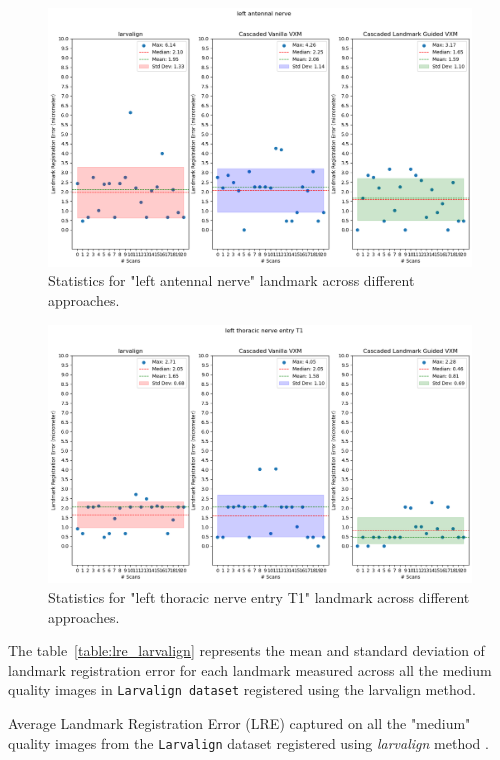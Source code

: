 \documentclass{report}
\begin{document}
\begin{figure}[h!]
	\centering
	\includegraphics[width=0.7\columnwidth]{resources/chapter5_fresh/output/left antennal nerve.png}
	\caption{Statistics for "left antennal nerve" landmark across different approaches.}
	\label{fig:landmark29}
\end{figure}

\begin{figure}[h!]
	\centering
	\includegraphics[width=0.7\columnwidth]{resources/chapter5_fresh/output/left thoracic nerve entry T1.png}
	\caption{Statistics for "left thoracic nerve entry T1" landmark across different approaches.}
	\label{fig:landmark30}
\end{figure}

	
	
	
	
	
	
	
	
	
	\clearpage
	
	
	
	The table~\ref{table:lre_larvalign} represents the mean and standard deviation of landmark registration error for each landmark measured across all the medium quality images in \texttt{Larvalign dataset} registered using the larvalign method.
	
	\begin{table}[h]
		\centering
		
		\caption{Average Landmark Registration Error (LRE) captured on all the "medium" quality images from the \texttt{Larvalign} dataset registered using \emph{larvalign} method \cite{larvalign}.}
		\label{table:lre_larvalign}
	\end{table}
\end{document}
